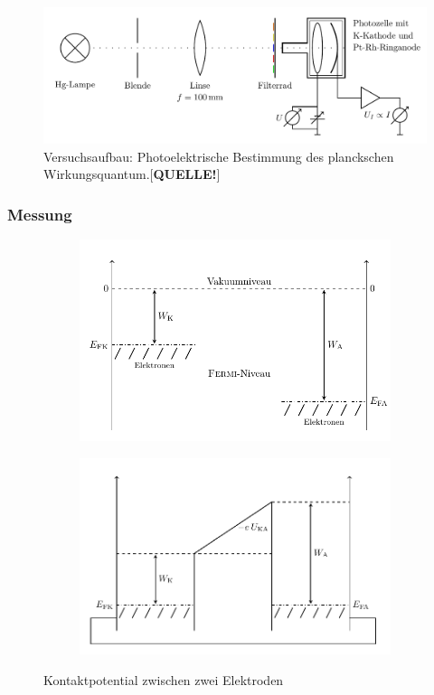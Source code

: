 \begin{figure}[htb]
	\centering
	\includegraphics[width=0.8\linewidth]{../figs/photozelle_optikbank}
	\caption{Versuchsaufbau: Photoelektrische Bestimmung des planckschen Wirkungsquantum.[\textbf{QUELLE!}]}
	\label{fig:photozelle_optikbank}
\end{figure}

\subsubsection{Messung}

\begin{figure}[htb]
	\centering
	\begin{subfigure}[c]{0.46\linewidth}
        \includegraphics[width=\linewidth]{../figs/fermi1.png}
    \end{subfigure}
	\begin{subfigure}[c]{0.46\linewidth}
        \includegraphics[width=\linewidth]{../figs/fermi2.png}
    \end{subfigure}
	\caption{Kontaktpotential zwischen zwei Elektroden}
\end{figure}